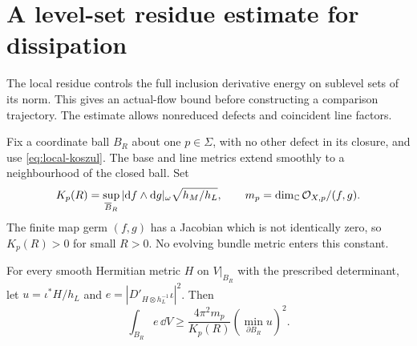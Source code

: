 \section{A level-set residue estimate for dissipation}
\label{sec:residue}

The local residue controls the full inclusion derivative energy
on sublevel sets of its norm. This gives an actual-flow bound
before constructing a comparison trajectory. The estimate
allows nonreduced defects and coincident line factors.

Fix a coordinate ball $B_R$ about one $p\in\Sigma$, with no
other defect in its closure, and use \eqref{eq:local-koszul}.
The base and line metrics extend smoothly to a neighbourhood
of the closed ball. Set
\begin{equation}\label{eq:jacobian-bound}
 K_p(R)=\sup_{\overline B_R}
       |\mathrm d f\wedge\mathrm d g|_\omega\sqrt{h_M/h_L},
           \qquad m_p=\dim_\mathbb C\mathcal O_{X,p}/(f,g).
\end{equation}
The finite map germ $(f,g)$ has a Jacobian which is not
identically zero, so $K_p(R)>0$ for small $R>0$.
No evolving bundle metric enters this constant.

\begin{lemma}\label{lem:level-set-residue}
For every smooth Hermitian metric $H$ on $V|_{B_R}$ with the
prescribed determinant, let $u=\iota^*H/h_L$ and
$e=|D'_{H\otimes h_L^{-1}}\iota|^2$. Then
\begin{equation}\label{eq:local-residue-bound}
 \int_{B_R}e\,\dd V
       \ge\frac{4\pi^2m_p}{K_p(R)}
                      \left(\min_{\partial B_R}u\right)^2 .
\end{equation}
\end{lemma}

